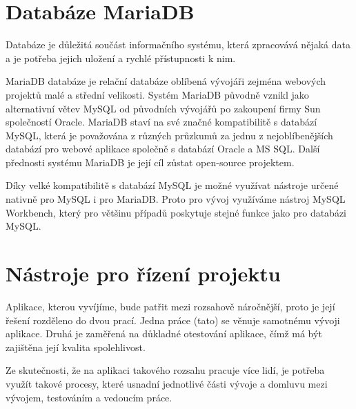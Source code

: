\documentclass[czech,BP]{thesiskiv}
\begin{document}
\section{Databáze MariaDB}
	\par Databáze je důležitá součást informačního systému, která zpracovává nějaká data a je potřeba jejich uložení a rychlé přístupnosti k nim.
	\par MariaDB databáze je relační databáze oblíbená vývojáři zejména webových projektů malé a střední velikosti. Systém MariaDB původně vznikl jako alternativní větev MySQL od původních vývojářů po zakoupení firmy Sun společností Oracle. MariaDB staví na své značné kompatibilitě s databází MySQL, která je považována z různých průzkumů za jednu z nejoblíbenějších databází pro webové aplikace společně s databází Oracle a MS SQL. Další přednosti systému MariaDB je její cíl zůstat open-source projektem.
	\par Díky velké kompatibilitě s databází MySQL je možné využívat nástroje určené nativně pro MySQL i pro MariaDB. Proto pro vývoj využíváme nástroj MySQL Workbench, který pro většinu případů poskytuje stejné funkce jako pro databázi MySQL.
\section{Nástroje pro řízení projektu}
	\par Aplikace, kterou vyvíjíme, bude patřit mezi rozsahově náročnější, proto je její řešení rozděleno do dvou prací. Jedna práce (tato) se věnuje samotnému vývoji aplikace. Druhá je zaměřená na důkladné otestování aplikace, čímž má být zajištěna její kvalita spolehlivost.
	\par Ze skutečnosti, že na aplikaci takového rozsahu pracuje více lidí, je potřeba využít takové procesy, které usnadní jednotlivé části vývoje a domluvu mezi vývojem, testováním a vedoucím práce.
\end{document}

